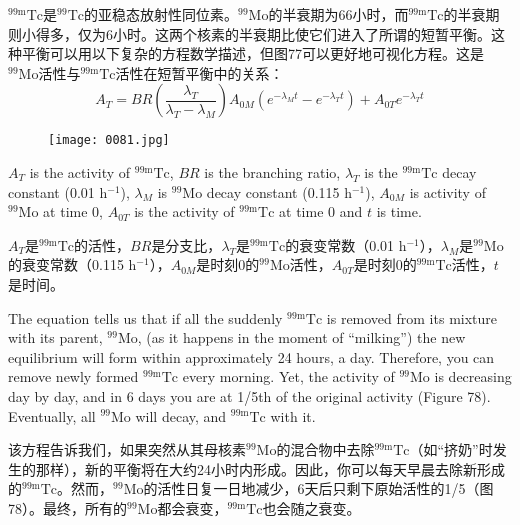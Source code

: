 \documentclass[dvipsnames, svgnames,a4paper,11pt]{article}
\begin{document}
$^{99\text{m}}\text{Tc}$是$^{99}\text{Tc}$的亚稳态放射性同位素。$^{99}\text{Mo}$的半衰期为66小时，而$^{99\text{m}}\text{Tc}$的半衰期则小得多，仅为6小时。这两个核素的半衰期比使它们进入了所谓的短暂平衡。这种平衡可以用以下复杂的方程数学描述，但图77可以更好地可视化方程。这是$^{99}\text{Mo}$活性与$^{99\text{m}}\text{Tc}$活性在短暂平衡中的关系：  
$$A_T = BR \left( \frac{\lambda_T}{\lambda_T - \lambda_M} \right) A_{0M} \left( e^{-\lambda_M t} - e^{-\lambda_T t} \right) + A_{0T} e^{-\lambda_T t}$$

\begin{figure}[ht]
    \centering
    \texttt{[image: 0081.jpg]}
     \label{fig77}
\end{figure}

$A_T$ is the activity of $^{99\text{m}}\text{Tc}$, $BR$ is the branching ratio, $\lambda_T$ is the $^{99\text{m}}\text{Tc}$ decay constant (0.01 h$^{-1}$), $\lambda_M$ is $^{99}\text{Mo}$ decay constant (0.115 h$^{-1}$), $A_{0M}$ is activity of $^{99}\text{Mo}$ at time 0, $A_{0T}$ is the activity of $^{99\text{m}}\text{Tc}$ at time 0 and $t$ is time.

$A_T$是$^{99\text{m}}\text{Tc}$的活性，$BR$是分支比，$\lambda_T$是$^{99\text{m}}\text{Tc}$的衰变常数（0.01 h$^{-1}$），$\lambda_M$是$^{99}\text{Mo}$的衰变常数（0.115 h$^{-1}$），$A_{0M}$是时刻0的$^{99}\text{Mo}$活性，$A_{0T}$是时刻0的$^{99\text{m}}\text{Tc}$活性，$t$是时间。

The equation tells us that if all the suddenly $^{99\text{m}}\text{Tc}$ is removed from its mixture with its parent, $^{99}\text{Mo}$, (as it happens in the moment of “milking”) the new equilibrium will form within approximately 24 hours, a day. Therefore, you can remove newly formed $^{99\text{m}}\text{Tc}$ every morning. Yet, the activity of $^{99}\text{Mo}$ is decreasing day by day, and in 6 days you are at 1/5th of the original activity (Figure 78). Eventually, all $^{99}\text{Mo}$ will decay, and $^{99\text{m}}\text{Tc}$ with it.

该方程告诉我们，如果突然从其母核素$^{99}\text{Mo}$的混合物中去除$^{99\text{m}}\text{Tc}$（如“挤奶”时发生的那样），新的平衡将在大约24小时内形成。因此，你可以每天早晨去除新形成的$^{99\text{m}}\text{Tc}$。然而，$^{99}\text{Mo}$的活性日复一日地减少，6天后只剩下原始活性的1/5（图78）。最终，所有的$^{99}\text{Mo}$都会衰变，$^{99\text{m}}\text{Tc}$也会随之衰变。
\end{document}

